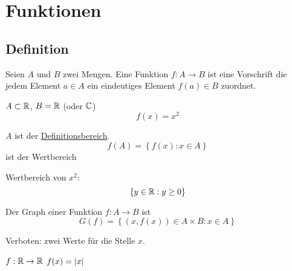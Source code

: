 \section{Funktionen}\label{s:F}
\subsection{Definition}
\begin{Def}
  Seien $A$ und $B$ zwei Mengen. Eine Funktion $f:A\to B$ ist eine Vorschrift die jedem Element $a\in A$ ein eindeutiges Element $f(a)\in B$ zuordnet.
\end{Def}
\begin{Bsp}
  $A\subset \mathbb{R}$, $B=\mathbb{R}$ (oder $\mathbb{C}$)
  \[f(x)=x^2\]
\end{Bsp}
\begin{Def}
  $A$ ist der \underline{Definitionsbereich}.
  \[f(A)=\left\{ f(x): x\in A \right\}\]
  ist der Wertbereich
\end{Def}
\begin{Bem}
  Wertbereich von $x^2$:
  \[\left\{ y\in\mathbb{R}: y\geq 0 \right\}\]
\end{Bem}
\begin{Def}
  Der Graph einer Funktion $f:A\to B$ ist
  \[G(f)=\left\{ (x, f(x))\in A \times B:x\in A \right\}\]
\end{Def}
\begin{Bsp}
  Verboten: zwei Werte für die Stelle $x$.
\end{Bsp}
\begin{Bsp}
  $f:\mathbb{R}\to\mathbb{R}$ $f(x)=\mathopen| x \mathclose|$
\end{Bsp}
